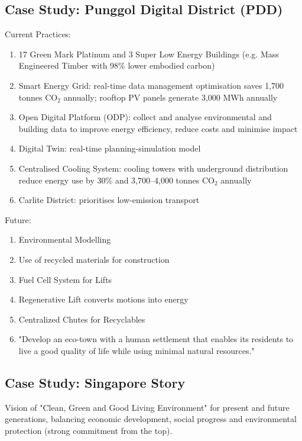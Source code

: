 \documentclass[12pt, a4paper]{article}
\begin{document}
\begin{multicols*}{3}
\subsection{Case Study: Punggol Digital District (PDD)}
Current Practices:
\begin{enumerate}[\roman*.]
  \item 17 Green Mark Platinum and 3 Super Low Energy Buildings (e.g. Mass Engineered Timber with 98\% lower embodied carbon)
  \item Smart Energy Grid: real-time data management optimisation saves 1,700 tonnes CO$_2$ annually; rooftop PV panels generate 3,000 MWh annually
  \item Open Digital Platform (ODP): collect and analyse environmental and building data to improve energy efficiency, reduce costs and minimise impact
  \item Digital Twin: real-time planning-simulation model
  \item Centralised Cooling System: cooling towers with underground distribution reduce energy use by $30\%$ and 3,700--4,000 tonnes CO$_2$ annually
  \item Carlite District: prioritises low-emission transport
\end{enumerate}

Future:
\begin{enumerate}[\roman*.]
  \item Environmental Modelling
  \item Use of recycled materials for construction
  \item Fuel Cell System for Lifts 
  \item Regenerative Lift converts motions into energy
  \item Centralized Chutes for Recyclables
  \item "Develop an eco-town with a human settlement that enables its residents to live a
good quality of life while using minimal natural resources."
\end{enumerate}

\colbreak
\subsection{Case Study: Singapore Story}
Vision of "Clean, Green and Good Living Environment" for present and future generations, balancing economic development, social progress and environmental protection (strong commitment from the top).


\end{multicols*}
\end{document}
